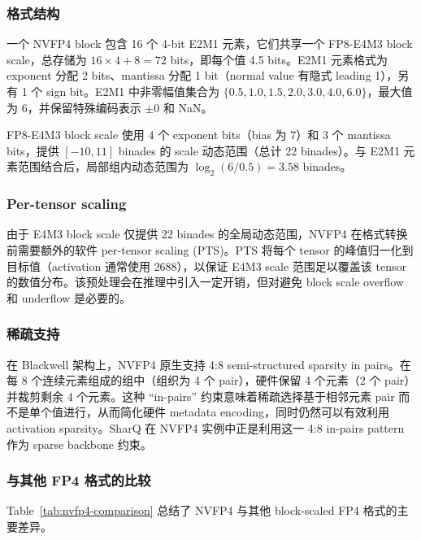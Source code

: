 \documentclass{article}
\begin{document}
\subsubsection{格式结构}

一个 NVFP4 block 包含 16 个 4-bit E2M1 元素，它们共享一个 FP8-E4M3 block scale，总存储为
$16 \times 4 + 8 = 72$ bits，即每个值 4.5 bits。E2M1 元素格式为 exponent 分配 2 bits、mantissa
分配 1 bit（normal value 有隐式 leading 1），另有 1 个 sign bit。E2M1 中非零幅值集合为
$\{0.5, 1.0, 1.5, 2.0, 3.0, 4.0, 6.0\}$，最大值为 6，并保留特殊编码表示 $\pm 0$ 和 NaN。

FP8-E4M3 block scale 使用 4 个 exponent bits（bias 为 7）和 3 个 mantissa bits，提供
$[-10, 11]$ binades 的 scale 动态范围（总计 22 binades）。与 E2M1 元素范围结合后，局部组内动态范围为
$\log_2(6/0.5) = 3.58$ binades。

\subsubsection{Per-tensor scaling}

由于 E4M3 block scale 仅提供 22 binades 的全局动态范围，NVFP4 在格式转换前需要额外的软件 per-tensor scaling
(PTS)。PTS 将每个 tensor 的峰值归一化到目标值（activation 通常使用 2688），以保证 E4M3 scale
范围足以覆盖该 tensor 的数值分布。该预处理会在推理中引入一定开销，但对避免 block scale overflow 和 underflow 是必要的。

\subsubsection{稀疏支持}

在 Blackwell 架构上，NVFP4 原生支持 4:8 semi-structured sparsity in pairs。在每 8 个连续元素组成的组中（组织为
4 个 pair），硬件保留 4 个元素（2 个 pair）并裁剪剩余 4 个元素。这种 ``in-pairs'' 约束意味着稀疏选择基于相邻元素 pair
而不是单个值进行，从而简化硬件 metadata encoding，同时仍然可以有效利用 activation sparsity。SharQ 在 NVFP4
实例中正是利用这一 4:8 in-pairs pattern 作为 sparse backbone 约束。

\subsubsection{与其他 FP4 格式的比较}

Table~\ref{tab:nvfp4-comparison} 总结了 NVFP4 与其他 block-scaled FP4 格式的主要差异。
\end{document}
